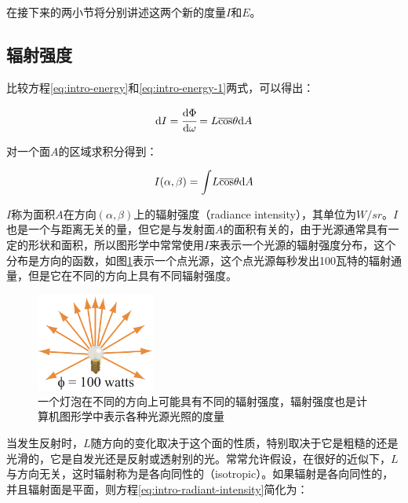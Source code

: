 \noindent 在接下来的两小节将分别讲述这两个新的度量$I$和$E$。





\subsection{辐射强度}
比较方程\ref{eq:intro-energy}和\ref{eq:intro-energy-1}两式，可以得出：

\begin{equation}
	{\rm d}I= \cfrac{{\rm d}\Phi}{{\rm d}\omega}=L\overline{\cos}\theta {\rm d}A
\end{equation}

\noindent 对一个面$A$的区域求积分得到：

\begin{equation}\label{eq:intro-radiant-intensity}
	I(\alpha,\beta)={\rm \int} L\overline{\cos}\theta {\rm d}A
\end{equation}

$I$称为面积$A$在方向$(\alpha,\beta)$上的辐射强度（radiance intensity），其单位为$W/sr$。$I$也是一个与距离无关的量，但它是与发射面$A$的面积有关的，由于光源通常具有一定的形状和面积，所以图形学中常常使用$I$来表示一个光源的辐射强度分布，这个分布是方向的函数，如图\ref{f:intro-radiant-intensity}表示一个点光源，这个点光源每秒发出100瓦特的辐射通量，但是它在不同的方向上具有不同辐射强度。

\begin{figure}
\sidecaption
	\includegraphics[width=0.35\textwidth]{figures/intro/radiant-intensity}
	\caption{一个灯泡在不同的方向上可能具有不同的辐射强度，辐射强度也是计算机图形学中表示各种光源光照的度量}
	\label{f:intro-radiant-intensity}
\end{figure}

当发生反射时，$L$随方向的变化取决于这个面的性质，特别取决于它是粗糙的还是光滑的，它是自发光还是反射或透射别的光。常常允许假设，在很好的近似下，$L$与方向无关，这时辐射称为是各向同性的（isotropic）。如果辐射是各向同性的，并且辐射面是平面，则方程\ref{eq:intro-radiant-intensity}简化为：

